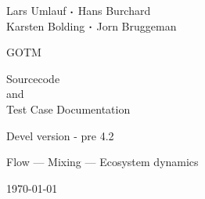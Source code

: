 \documentclass[a4paper,twoside,11pt]{article}
\begin{document}
\begin{titlepage}


{\sf \bf \LARGE
 \begin{center}
   Lars Umlauf ${\boldsymbol \cdot}$ Hans Burchard \\ Karsten Bolding
   ${\boldsymbol \cdot}$ Jorn Bruggeman
 \end{center}
}

\vspace{6mm}

{\sf \bf \Huge
 \begin{center}
   GOTM
 \end{center}
}

\vspace{6mm}

{\sf \bf \LARGE
 \begin{center}
   Sourcecode \\
      and \\
Test Case Documentation
 \end{center}
}


\vspace{5mm}

{\sf \bf \Large
 \begin{center}
  Devel version - pre 4.2
 \end{center}
}

\vspace{8mm}

\begin{figure}[!h]
  \begin{center}
  \end{center}
\end{figure}

\vfill

{\sf \bf \Large
 \begin{center}
  Flow ---  Mixing --- Ecosystem dynamics
\end{center}
}


{\sf \bf \Large
 \begin{center}
\today
 \end{center}
}

\end{titlepage}

\cleardoublepage
\tableofcontents


\cleardoublepage
\end{document}
